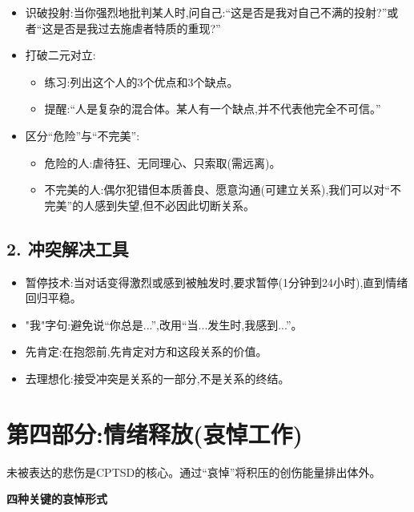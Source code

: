 \documentclass[11pt, a4paper]{article}
\begin{document}
\begin{itemize}
    \item 识破投射:当你强烈地批判某人时,问自己:“这是否是我对自己不满的投射?”或者“这是否是我过去施虐者特质的重现?”
    \item 打破二元对立:
    \begin{itemize}
        \item 练习:列出这个人的3个优点和3个缺点。
        \item 提醒:“人是复杂的混合体。某人有一个缺点,并不代表他完全不可信。”
    \end{itemize}
    \item 区分“危险”与“不完美”:
    \begin{itemize}
        \item 危险的人:虐待狂、无同理心、只索取(需远离)。
        \item 不完美的人:偶尔犯错但本质善良、愿意沟通(可建立关系),我们可以对“不完美”的人感到失望,但不必因此切断关系。
    \end{itemize}
\end{itemize}

\subsection*{2. 冲突解决工具}
\begin{itemize}
    \item 暂停技术:当对话变得激烈或感到被触发时,要求暂停(1分钟到24小时),直到情绪回归平稳。
    \item "我"字句:避免说“你总是...”,改用“当...发生时,我感到...”。
    \item 先肯定:在抱怨前,先肯定对方和这段关系的价值。
    \item 去理想化:接受冲突是关系的一部分,不是关系的终结。
\end{itemize}

\newpage


\section{第四部分:情绪释放(哀悼工作)}

未被表达的悲伤是CPTSD的核心。通过“哀悼”将积压的创伤能量排出体外。

\textbf{四种关键的哀悼形式}
\end{document}
